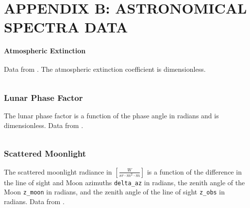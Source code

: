\clearpage
\chapter{APPENDIX B: ASTRONOMICAL SPECTRA DATA} \label{data:spectra}

\subsubsection{Atmospheric Extinction} \label{data:atm} Data from \cite{krag2003}.
The atmospheric extinction coefficient is dimensionless.
\begin{listing}[H]
\inputminted[breaklines=true, breakanywhere=true, breaksymbol=\hspace{0pt}, fontsize=\footnotesize]{json}{/Users/liamrobinson/Documents/PyLightCurves/mirage/resources/data/atmos_extinction.json}
\end{listing}


\subsection{Lunar Phase Factor}
The lunar phase factor is a function of the phase angle in radians and is dimensionless. Data from \cite{daniels1977}.
\begin{listing}[H]
\inputminted[breaklines=true, breakanywhere=true, breaksymbol=\hspace{0pt}, fontsize=\footnotesize]{json}{/Users/liamrobinson/Documents/PyLightCurves/mirage/resources/data/lunar_phase.json}
\end{listing}

\clearpage
\subsection{Scattered Moonlight}
The scattered moonlight radiance in $\left[ \frac{W}{sr \cdot m^2 \cdot m} \right]$ is a function of the difference in the line of sight and Moon azimuths \texttt{delta\_az} in radians, the zenith angle of the Moon \texttt{z\_moon} in radians, and the zenith angle of the line of sight \texttt{z\_obs} in radians. Data from \cite{daniels1977}.

